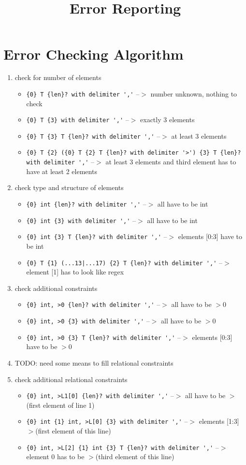 \documentclass[11pt]{article}
\begin{document}
\title{Error Reporting}


\section{Error Checking Algorithm}

\begin{enumerate}
\item check for number of elements
\begin{itemize}
\item \verb|{0} T {len}? with delimiter ','| --$>$ number unknown, nothing to check
\item \verb|{0} T {3} with delimiter ','| --$>$ exactly 3 elements
\item \verb|{0} T {3} T {len}? with delimiter ','| --$>$ at least 3 elements
\item \verb|{0} T {2} ({0} T {2} T {len}? with delimiter '>') {3} T {len}? with delimiter ','| --$>$ at least 3 elements and third element has to have at least 2 elements
\end{itemize}
\item check type and structure of elements
\begin{itemize}
\item \verb|{0} int {len}? with delimiter ','| --$>$ all have to be int
\item \verb|{0} int {3} with delimiter ','| --$>$ all have to be int
\item \verb|{0} int {3} T {len}? with delimiter ','| --$>$ elements [0:3] have to be int
\item \verb;{0} T {1} (...13|...17) {2} T {len}? with delimiter ','; --$>$ element [1] has to look like regex
\end{itemize}
\item check additional constraints
\begin{itemize}
\item \verb|{0} int, >0 {len}? with delimiter ','| --$>$ all have to be $>$0
\item \verb|{0} int, >0 {3} with delimiter ','| --$>$ all have to be $>$0
\item \verb|{0} int, >0 {3} T {len}? with delimiter ','| --$>$ elements [0:3] have to be $>$0
\end{itemize}
\item TODO: need some means to fill relational constraints
\item check additional relational constraints
\begin{itemize}
\item \verb|{0} int, >L1[0] {len}? with delimiter ','| --$>$ all have to be $>$(first element of line 1)
\item \verb|{0} int {1} int, >L[0] {3} with delimiter ','| --$>$ elements [1:3] $>$(first element of this line)
\item \verb|{0} int, >L[2] {1} int {3} T {len}? with delimiter ','| --$>$ element 0 has to be $>$(third element of this line)
\end{itemize}
\end{enumerate}
\end{document}
